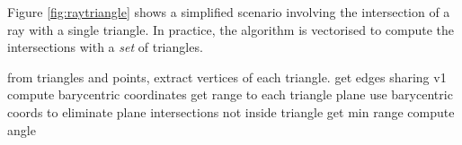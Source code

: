 	Figure \ref{fig:raytriangle} shows a simplified scenario involving the intersection of a ray with a single triangle. In practice, the algorithm is vectorised to compute the intersections with a \textit{set} of triangles.
	 
	
	
	from triangles and points, extract vertices of each triangle.
	get edges sharing v1
	compute barycentric coordinates
	get range to each triangle plane
	use barycentric coords to eliminate plane intersections not inside triangle
	get min range
	compute angle	

	\IncMargin{2em}
	\begin{algorithm}
	\DontPrintSemicolon
	

\end{algorithm}
